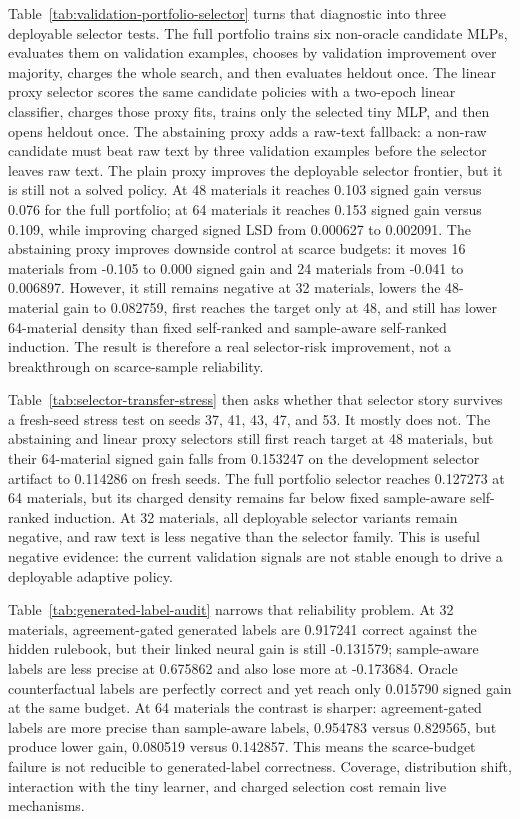 \documentclass[11pt]{article}
\begin{document}
Table~\ref{tab:validation-portfolio-selector} turns that diagnostic into three
deployable selector tests. The full portfolio trains six non-oracle candidate
MLPs, evaluates them on validation examples, chooses by validation improvement
over majority, charges the whole search, and then evaluates heldout once. The
linear proxy selector scores the same candidate policies with a two-epoch
linear classifier, charges those proxy fits, trains only the selected tiny MLP,
and then opens heldout once. The abstaining proxy adds a raw-text fallback: a
non-raw candidate must beat raw text by three validation examples before the
selector leaves raw text. The plain proxy improves the deployable selector
frontier, but it is still not a solved policy. At 48 materials it reaches 0.103
signed gain versus 0.076 for the full portfolio; at 64 materials it reaches
0.153 signed gain versus 0.109, while improving charged signed LSD from
0.000627 to 0.002091. The abstaining proxy improves downside control at scarce
budgets: it moves 16 materials from -0.105 to 0.000 signed gain and 24
materials from -0.041 to 0.006897. However, it still remains negative at 32
materials, lowers the 48-material gain to 0.082759, first reaches the target
only at 48, and still has lower 64-material density than fixed self-ranked and
sample-aware self-ranked induction. The result is therefore a real
selector-risk improvement, not a breakthrough on scarce-sample reliability.

Table~\ref{tab:selector-transfer-stress} then asks whether that selector story
survives a fresh-seed stress test on seeds 37, 41, 43, 47, and 53. It mostly
does not. The abstaining and linear proxy selectors still first reach target at
48 materials, but their 64-material signed gain falls from 0.153247 on the
development selector artifact to 0.114286 on fresh seeds. The full portfolio
selector reaches 0.127273 at 64 materials, but its charged density remains far
below fixed sample-aware self-ranked induction. At 32 materials, all deployable
selector variants remain negative, and raw text is less negative than the
selector family. This is useful negative evidence: the current validation
signals are not stable enough to drive a deployable adaptive policy.

Table~\ref{tab:generated-label-audit} narrows that reliability problem. At 32
materials, agreement-gated generated labels are 0.917241 correct against the
hidden rulebook, but their linked neural gain is still -0.131579; sample-aware
labels are less precise at 0.675862 and also lose more at -0.173684. Oracle
counterfactual labels are perfectly correct and yet reach only 0.015790 signed
gain at the same budget. At 64 materials the contrast is sharper:
agreement-gated labels are more precise than sample-aware labels, 0.954783
versus 0.829565, but produce lower gain, 0.080519 versus 0.142857. This means
the scarce-budget failure is not reducible to generated-label correctness.
Coverage, distribution shift, interaction with the tiny learner, and charged
selection cost remain live mechanisms.
\end{document}
